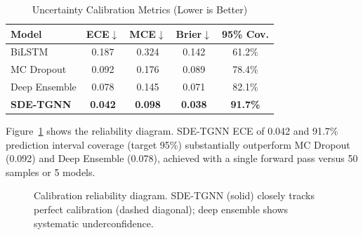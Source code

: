 \documentclass[10pt,journal,compsoc]{IEEEtran}
\begin{document}
\begin{table}[!t]
\centering
\caption{Uncertainty Calibration Metrics (Lower is Better)}
\label{tab:calibration}
\small
\begin{tabular}{@{}lcccc@{}}
\toprule
\textbf{Model} & \textbf{ECE}$\downarrow$ & \textbf{MCE}$\downarrow$ & \textbf{Brier}$\downarrow$ & \textbf{95\% Cov.} \\
\midrule
BiLSTM & 0.187 & 0.324 & 0.142 & 61.2\% \\
MC Dropout & 0.092 & 0.176 & 0.089 & 78.4\% \\
Deep Ensemble & 0.078 & 0.145 & 0.071 & 82.1\% \\
\textbf{SDE-TGNN} & \textbf{0.042} & \textbf{0.098} & \textbf{0.038} & \textbf{91.7\%} \\
\bottomrule
\end{tabular}
\end{table}

Figure~\ref{fig:calibration} shows the reliability diagram. SDE-TGNN ECE of 0.042 and 91.7\% prediction interval coverage (target 95\%) substantially outperform MC Dropout (0.092) and Deep Ensemble (0.078), achieved with a single forward pass versus 50 samples or 5 models.

\begin{figure}[!t]
\centering
{}
\vspace{-0.3cm}
\caption{Calibration reliability diagram. SDE-TGNN (solid) closely tracks perfect calibration (dashed diagonal); deep ensemble shows systematic underconfidence.}
\label{fig:calibration}
\end{figure}
\end{document}
